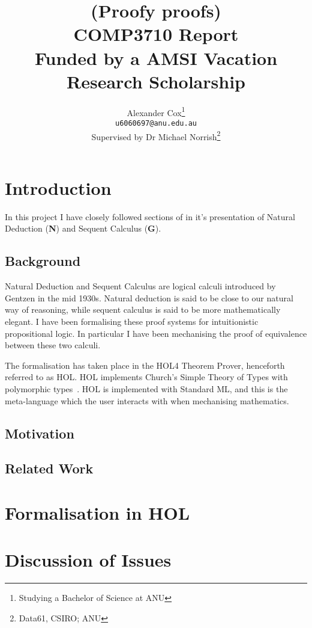 \documentclass[a4paper]{article}
\title{(Proofy proofs)\\
  \normalsize{} COMP3710 Report\\
  Funded by a AMSI Vacation Research Scholarship}
\author{Alexander Cox\thanks{Studying a Bachelor of Science at ANU}\\
      \small\texttt{u6060697@anu.edu.au}\\
      \normalsize{}Supervised by Dr Michael Norrish\thanks{Data61, CSIRO; ANU}}
\newcommand{\N}{\textbf{N}}
\newcommand{\G}{\textbf{G}}
\theoremstyle{definition}
\theoremstyle{remark}
\begin{document}
\maketitle

\begin{abstract}
\end{abstract}

\section{Introduction}
In this project I have closely followed sections of \textcite{bpt} in it's presentation of Natural Deduction (\N) and Sequent Calculus (\G).
\subsection{Background}
Natural Deduction and Sequent Calculus are logical calculi introduced by Gentzen in the mid 1930s. Natural deduction is said to be close to our natural way of reasoning, while sequent calculus is said to be more mathematically elegant. I have been formalising these proof systems for intuitionistic propositional logic. In particular I have been mechanising the proof of equivalence between these two calculi.

The formalisation has taken place in the HOL4 Theorem Prover, henceforth referred to as HOL. HOL implements Church's Simple Theory of Types with polymorphic types~\autocite{HOLbrief}. HOL is implemented with Standard ML, and this is the meta-language which the user interacts with when mechanising mathematics.

\subsection{Motivation}

\subsection{Related Work}

\section{Formalisation in HOL}
\section{Discussion of Issues} %
\end{document}
